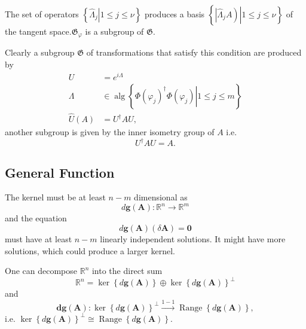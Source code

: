 \documentclass[aps,preprint]{revtex4}%
\begin{document}
The set of operators $\left\{  \left.  \widehat{\Lambda}_{j}\right\vert 1\leq
j\leq\nu\right\}  $ produces a basis $\left\{  \left.  \left\vert
\widehat{\Lambda}_{j}A\right)  \right\vert 1\leq j\leq\nu\right\}  $ of the
tangent space$.\mathfrak{G}_{\varphi}$ is a subgroup of $\mathfrak{G}.$

Clearly a subgroup $\mathfrak{G}$ of transformations that satisfy this
condition are produced by
\begin{align}
U  &  =e^{i\Lambda}\\
\Lambda &  \in\operatorname{alg}\left\{  \left.  \Phi\left(  \varphi
_{j}\right)  ^{\dagger}\Phi\left(  \varphi_{j}\right)  \right\vert 1\leq j\leq
m\right\} \\
\widehat{U}\left(  A\right)   &  =U^{\dagger}AU,
\end{align}
another subgroup is given by the inner isometry group of $A$ i.e.%
\begin{equation}
U^{\dagger}AU=A.
\end{equation}


\subsection{General Function}

The kernel must be at least $n-m$ dimensional as
\begin{equation}
d\boldsymbol{g}\left(  \boldsymbol{A}\right)  :\mathbb{R}^{n}\rightarrow
\mathbb{R}^{m}%
\end{equation}
and the equation
\[
d\boldsymbol{g}\left(  \boldsymbol{A}\right)  \left(  \delta\boldsymbol{A}%
\right)  =\boldsymbol{0}%
\]
must have at least $n-m$ linearly independent solutions. It might have more
solutions, which could produce a larger kernel.

One can decompose $\mathbb{R}^{n}$ into the direct sum
\[
\mathbb{R}^{n}=\ker\left\{  d\boldsymbol{g}\left(  \boldsymbol{A}\right)
\right\}  \oplus\ker\left\{  d\boldsymbol{g}\left(  \boldsymbol{A}\right)
\right\}  ^{\bot}%
\]
and
\[
\boldsymbol{dg}\left(  \boldsymbol{A}\right)  :\ker\left\{  d\boldsymbol{g}%
\left(  \boldsymbol{A}\right)  \right\}  ^{\bot}\overset{1-1}{\rightarrow
}\operatorname*{Range}\left\{  d\boldsymbol{g}\left(  \boldsymbol{A}\right)
\right\}  ,
\]
i.e. $\ker\left\{  d\boldsymbol{g}\left(  \boldsymbol{A}\right)  \right\}
^{\bot}\cong\operatorname*{Range}\left\{  d\boldsymbol{g}\left(
\boldsymbol{A}\right)  \right\}  $.
\end{document}
